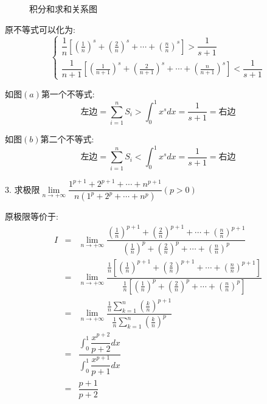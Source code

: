 \begin{figure}[H]
{
		}
	\caption{积分和求和关系图}
\end{figure} 
\begin{solution}
	
	原不等式可以化为: 
	$$\left\lbrace
	\begin{array}{l}
		\dfrac{1}{n}[(\frac{1}{n})^s+(\frac{2}{n})^s+\cdots+(\frac{n}{n})^s]>\dfrac{1}{s+1}\\
		\dfrac{1}{n+1}[(\frac{1}{n+1})^s+(\frac{2}{n+1})^s+\cdots+(\frac{n}{n+1})^s]<\dfrac{1}{s+1}
	\end{array}
	\right. $$
	
	如图$(a)$第一个不等式: 
	$$\text{左边}=\sum\limits_{i=1}^{n}S_{i}>\int_{0}^{1}x^sdx=\dfrac{1}{s+1}=\text{右边}$$
	
	如图$(b)$第二个不等式: 
	$$\text{左边}=\sum\limits_{i=1}^{n}S_{i}<\int_{0}^{1}x^sdx=\dfrac{1}{s+1}=\text{右边}$$
\end{solution}

3. 求极限$\lim\limits_{n\rightarrow +\infty}\dfrac{1^{p+1}+2^{p+1}+\cdots+n^{p+1}}{n(1^p+2^p+\cdots+n^p)}(p>0)$
\begin{solution}
	
	原极限等价于: 
	\begin{eqnarray*}
		I&=&\lim\limits_{n\rightarrow +\infty}\dfrac{(\frac{1}{n})^{p+1}+(\frac{2}{n})^{p+1}+\cdots+(\frac{n}{n})^{p+1}}{(\frac{1}{n})^{p}+(\frac{2}{n})^{p}+\cdots+(\frac{n}{n})^{p}}\\
		&=&\lim\limits_{n\rightarrow +\infty}\dfrac{\frac{1}{n}[(\frac{1}{n})^{p+1}+(\frac{2}{n})^{p+1}+\cdots+(\frac{n}{n})^{p+1}]}{\frac{1}{n}[(\frac{1}{n})^{p}+(\frac{2}{n})^{p}+\cdots+(\frac{n}{n})^{p}]}\\
		&=&\lim\limits_{n\rightarrow +\infty}\dfrac{\frac{1}{n}\sum\limits_{k=1}^{n}(\frac{k}{n})^{p+1}}{\frac{1}{n}\sum\limits_{k=1}^{n}(\frac{k}{n})^{p}}\\
		&=&\dfrac{\int_{0}^{1}\dfrac{x^{p+2}}{p+2}dx}{\int_{0}^{1}\dfrac{x^{p+1}}{p+1}dx}\\
		&=&\dfrac{p+1}{p+2}
	\end{eqnarray*}
\end{solution}

